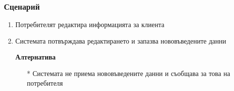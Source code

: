 \begin{frame}
\frametitle{Сценарий}
\begin{enumerate}
\item{Потребителят редактира информацията за клиента}
\item{Системата потвърждава редактирането и запазва нововъведените данни

\textbf{Алтернатива}
}
  \begin{enumerate}
\item[*]{Системата не приема нововъведените данни и съобщава за това на потребителя}
\end{enumerate}
\end{enumerate}

\end{frame}
